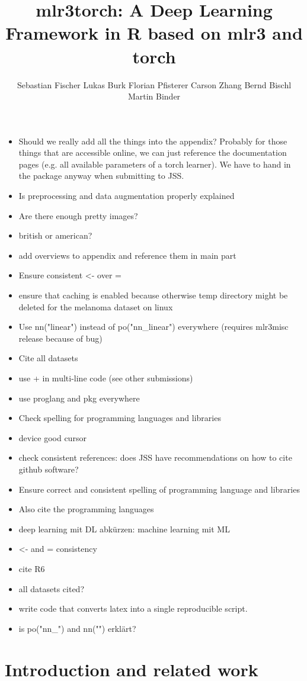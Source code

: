\documentclass[article, nojss]{jss}
\author{Sebastian Fischer \And Lukas Burk \And Florian Pfisterer \And Carson Zhang \AND Bernd Bischl \And Martin Binder}
\title{mlr3torch: A Deep Learning Framework in R based on mlr3 and torch}
\theoremstyle{definition}
\begin{document}
\begin{itemize}
    \item Should we really add all the things into the appendix? Probably for those things that are accessible online, we can just reference the documentation pages (e.g. all available parameters of a torch learner). We have to hand in the package anyway when submitting to JSS.
    \item Is preprocessing and data augmentation properly explained
    \item Are there enough pretty images?
    \item british or american?
    \item add overviews to appendix and reference them in main part
    \item Ensure consistent <- over = 
    \item ensure that caching is enabled because otherwise temp directory might be deleted for the melanoma dataset on linux
    \item Use nn("linear") instead of po("nn\_linear") everywhere (requires mlr3misc release because of bug)
    \item Cite all datasets
    \item use + in multi-line code (see other submissions)
    \item use proglang and pkg everywhere
    \item Check spelling for programming languages and libraries
    \item device good cursor 
    \item check consistent references: does JSS have recommendations on how to cite github software?
    \item Ensure correct and consistent spelling of programming language and libraries
    \item Also cite the programming languages
    \item deep learning mit DL abkürzen: machine learning mit ML
    \item <- and = consistency
    \item cite R6
    \item all datasets cited?
    \item write code that converts latex into a single reproducible script.
    \item is po("nn\_") and nn("") erklärt?
\end{itemize}




\section{Introduction and related work}
\end{document}

